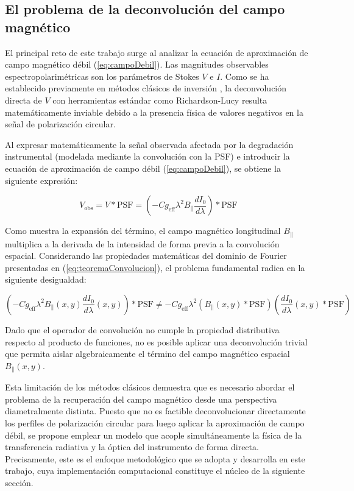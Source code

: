 \subsection{El problema de la deconvolución del campo magnético}

El principal reto de este trabajo surge al analizar la ecuación de aproximación de campo magnético débil (\ref{eq:campoDebil}). Las magnitudes observables espectropolarimétricas son los parámetros de Stokes $V$ e $I$. Como se ha establecido previamente en métodos clásicos de inversión \cite{AsensioRamos2008}, la deconvolución directa de $V$ con herramientas estándar como Richardson-Lucy resulta matemáticamente inviable debido a la presencia física de valores negativos en la señal de polarización circular.

Al expresar matemáticamente la señal observada afectada por la degradación instrumental (modelada mediante la convolución con la PSF) e introducir la ecuación de aproximación de campo débil (\ref{eq:campoDebil}), se obtiene la siguiente expresión:

\begin{equation}
    \label{eq:expresionConvolucionada}
    V_{\mathrm{obs}} = V \ast \mathrm{PSF} = \left(-C g_{\mathrm{eff}} \lambda^2 B_{\parallel} \frac{d I_0}{d \lambda} \right) \ast \mathrm{PSF}
\end{equation}

Como muestra la expansión del término, el campo magnético longitudinal $B_{\parallel}$ multiplica a la derivada de la intensidad de forma previa a la convolución espacial. Considerando las propiedades matemáticas del dominio de Fourier presentadas en (\ref{eq:teoremaConvolucion}), el problema fundamental radica en la siguiente desigualdad:

\begin{equation}
    \label{eq:imposibilidadDecon}
    \left(-C g_{\mathrm{eff}} \lambda^2 B_{\parallel}(x, y) \frac{d I_0}{d \lambda}(x, y) \right) \ast \mathrm{PSF} \neq -C g_{\mathrm{eff}} \lambda^2 \left(B_{\parallel}(x, y) \ast \mathrm{PSF} \right) \left(\frac{d I_0}{d \lambda}(x, y) \ast \mathrm{PSF} \right)
\end{equation}

Dado que el operador de convolución no cumple la propiedad distributiva respecto al producto de funciones, no es posible aplicar una deconvolución trivial que permita aislar algebraicamente el término del campo magnético espacial $B_{\parallel}(x, y)$.

Esta limitación de los métodos clásicos demuestra que es necesario abordar el problema de la recuperación del campo magnético desde una perspectiva diametralmente distinta. Puesto que no es factible deconvolucionar directamente los perfiles de polarización circular para luego aplicar la aproximación de campo débil, se propone emplear un modelo que acople simultáneamente la física de la transferencia radiativa y la óptica del instrumento de forma directa. Precisamente, este es el enfoque metodológico que se adopta y desarrolla en este trabajo, cuya implementación computacional constituye el núcleo de la siguiente sección.